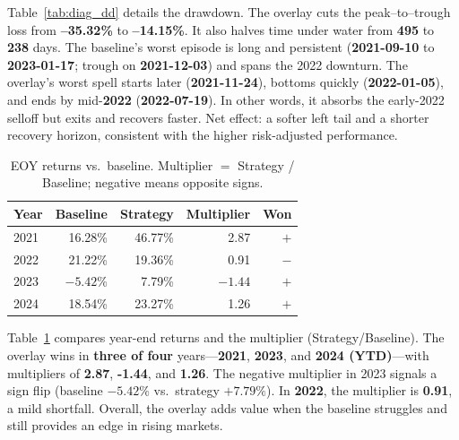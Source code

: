 Table~\ref{tab:diag_dd} details the drawdown. The overlay cuts the peak--to--trough loss from \textbf{--35.32\%} to \textbf{--14.15\%}. It also halves time under water from \textbf{495} to \textbf{238} days. The baseline’s worst episode is long and persistent (\textbf{2021-09-10} to \textbf{2023-01-17}; trough on \textbf{2021-12-03}) and spans the 2022 downturn. The overlay’s worst spell starts later (\textbf{2021-11-24}), bottoms quickly (\textbf{2022-01-05}), and ends by mid-\textbf{2022} (\textbf{2022-07-19}). In other words, it absorbs the early-2022 selloff but exits and recovers faster. Net effect: a softer left tail and a shorter recovery horizon, consistent with the higher risk-adjusted performance.

\begin{table}[t]
\centering
\caption{EOY returns vs.\ baseline. Multiplier $=$ Strategy / Baseline; negative means opposite signs.}
\label{tab:eoy}
\small
\begin{tabular}{lrrrr}
\toprule
Year & Baseline & Strategy & Multiplier & Won \\
\midrule
2021 & 16.28\% & 46.77\% & 2.87  & $+$ \\
2022 & 21.22\% & 19.36\% & 0.91  & $-$ \\
2023 & $-5.42$\% & 7.79\% & $-1.44$ & $+$ \\
2024 & 18.54\% & 23.27\% & 1.26  & $+$ \\
\bottomrule
\end{tabular}
\end{table}

Table~\ref{tab:eoy} compares year-end returns and the multiplier (Strategy/Baseline). The overlay wins in \textbf{three of four} years---\textbf{2021}, \textbf{2023}, and \textbf{2024 (YTD)}---with multipliers of \textbf{2.87}, \textbf{-1.44}, and \textbf{1.26}. The negative multiplier in 2023 signals a sign flip (baseline \(-5.42\%\) vs.\ strategy \(+7.79\%\)). In \textbf{2022}, the multiplier is \textbf{0.91}, a mild shortfall. Overall, the overlay adds value when the baseline struggles and still provides an edge in rising markets.

